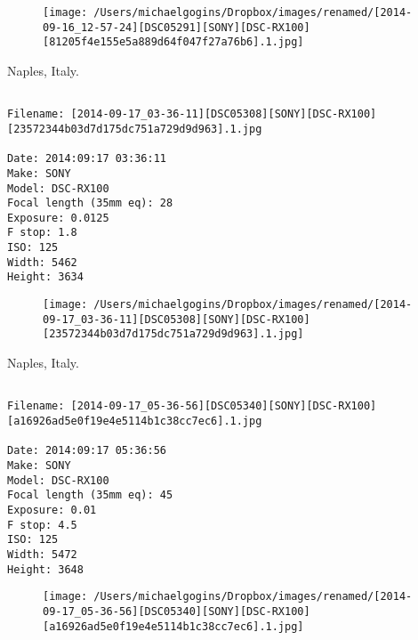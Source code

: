 \documentclass[11pt,letter,DIV=14,paper=landscape]{scrbook}
\begin{document}
\begin{figure}
\texttt{[image: /Users/michaelgogins/Dropbox/images/renamed/[2014-09-16\_12-57-24][DSC05291][SONY][DSC-RX100][81205f4e155e5a889d64f047f27a76b6].1.jpg]}
\end{figure}
    
\clearpage
\noindent Naples, Italy.
\noindent
\begin{lstlisting}

Filename: [2014-09-17_03-36-11][DSC05308][SONY][DSC-RX100][23572344b03d7d175dc751a729d9d963].1.jpg

Date: 2014:09:17 03:36:11
Make: SONY
Model: DSC-RX100
Focal length (35mm eq): 28
Exposure: 0.0125
F stop: 1.8
ISO: 125
Width: 5462
Height: 3634
\end{lstlisting}
\clearpage

\begin{figure}
\texttt{[image: /Users/michaelgogins/Dropbox/images/renamed/[2014-09-17\_03-36-11][DSC05308][SONY][DSC-RX100][23572344b03d7d175dc751a729d9d963].1.jpg]}
\end{figure}
    
\clearpage
\noindent Naples, Italy.
\noindent
\begin{lstlisting}

Filename: [2014-09-17_05-36-56][DSC05340][SONY][DSC-RX100][a16926ad5e0f19e4e5114b1c38cc7ec6].1.jpg

Date: 2014:09:17 05:36:56
Make: SONY
Model: DSC-RX100
Focal length (35mm eq): 45
Exposure: 0.01
F stop: 4.5
ISO: 125
Width: 5472
Height: 3648
\end{lstlisting}
\clearpage

\begin{figure}
\texttt{[image: /Users/michaelgogins/Dropbox/images/renamed/[2014-09-17\_05-36-56][DSC05340][SONY][DSC-RX100][a16926ad5e0f19e4e5114b1c38cc7ec6].1.jpg]}
\end{figure}
    
\end{document}
